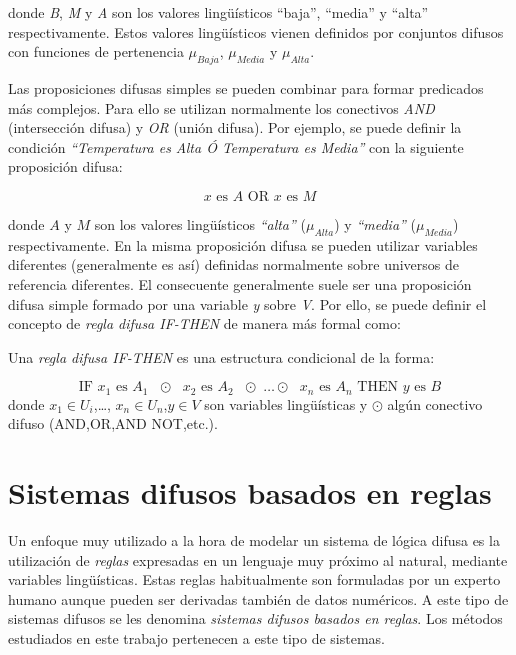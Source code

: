 donde \emph{B}, \emph{M} y \emph{A} son los valores lingüísticos ``baja'', ``media'' y ``alta'' respectivamente. Estos valores lingüísticos vienen definidos por conjuntos difusos con funciones de pertenencia $\mu_{Baja}$, $\mu_{Media}$ y $\mu_{Alta}$.

Las proposiciones difusas simples se pueden combinar para formar predicados más complejos. Para ello se utilizan normalmente los conectivos \emph{AND} (intersección difusa) y \emph{OR} (unión difusa). Por ejemplo, se puede definir la condición \emph{``Temperatura es Alta Ó Temperatura es Media''} con la siguiente proposición difusa:

\begin{equation}
\text{$x$ es $A$ OR $x$ es $M$}
\end{equation}

donde $A$ y $M$ son los valores lingüísticos \emph{``alta''} ($\mu_{Alta}$) y \emph{``media''} ($\mu_{Media}$) respectivamente. En la misma proposición difusa se pueden utilizar variables diferentes (generalmente es así) definidas normalmente sobre universos de referencia diferentes. El consecuente generalmente suele ser una proposición difusa simple formado por una variable \emph{y} sobre \emph{V}. Por ello, se puede definir el concepto de \emph{regla difusa IF-THEN} de manera más formal como:

\begin{definition}
Una \emph{regla difusa IF-THEN} es una estructura condicional de la forma:

\begin{equation}
\text{IF $x_{1}$ es $A_{1}$ $\odot$ $x_{2}$ es $A_{2}$ $\odot$ \ldots $\odot$ $x_{n}$ es $A_{n}$ THEN $y$ es $B$}
\end{equation}
donde $x_{1} \in U_{i}$,\ldots, $x_{n} \in U_{n}$,$y \in V$ son variables lingüísticas y $\odot$ algún conectivo difuso (AND,OR,AND NOT,etc.).
\end{definition}

\section{Sistemas difusos basados en reglas}\label{sec:sistemas-difusos-basados-en-reglas}
Un enfoque muy utilizado a la hora de modelar un sistema de lógica difusa es la utilización de \emph{reglas} expresadas en un lenguaje muy próximo al natural, mediante variables lingüísticas. Estas reglas habitualmente son formuladas por un experto humano aunque pueden ser derivadas también de datos numéricos. A este tipo de sistemas difusos se les denomina \emph{sistemas difusos basados en reglas}. Los métodos estudiados en este trabajo pertenecen a este tipo de sistemas.

